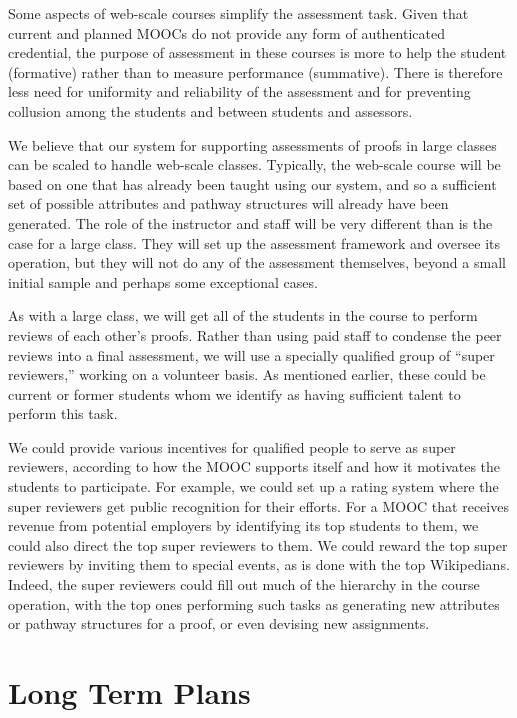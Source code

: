 \documentclass[12pt]{article}
\begin{document}
Some aspects of web-scale courses simplify the assessment task.
Given that current and planned MOOCs do not provide
any form of authenticated credential, the purpose of assessment in
these courses is more to help the student (formative) rather than to
measure performance (summative).  There is therefore less need for
uniformity and reliability of the assessment and for preventing
collusion among the students and between students and assessors.

We believe that our system for supporting assessments of proofs in
large classes can be scaled to handle web-scale classes.  Typically,
the web-scale course will be based on one that has already been
taught using our system, and so a sufficient set of possible attributes and
pathway structures will already have been generated.  The role of the
instructor and staff will be very different than is the case for a
large class.  They will set up the assessment framework and oversee
its operation, but they will not do any of the assessment themselves,
beyond a small initial sample and perhaps some exceptional cases.

As with a large class, we will get all of the students in the course
to perform reviews of each other's proofs.  Rather than using paid
staff to condense the peer reviews into a final assessment, we will
use a specially qualified group of ``super reviewers,'' working on a
volunteer basis.  As mentioned earlier, these could be current or
former students whom we identify as having sufficient talent to
perform this task.

We could provide various incentives for qualified people to serve as
super reviewers, according to how the MOOC supports itself and how it
motivates the students to participate.  For example, we could set up a
rating system where the super reviewers get public recognition for
their efforts.  For a MOOC that receives revenue from potential
employers by identifying its top students to them, we could also
direct the top super reviewers to them.  We could reward the top super
reviewers by inviting them to special events, as is done with the top
Wikipedians.  Indeed, the super reviewers could fill out much of the
hierarchy in the course operation, with the top ones performing such
tasks as generating new attributes or pathway structures for a proof,
or even devising new assignments.

\section{Long Term Plans}
\end{document}
